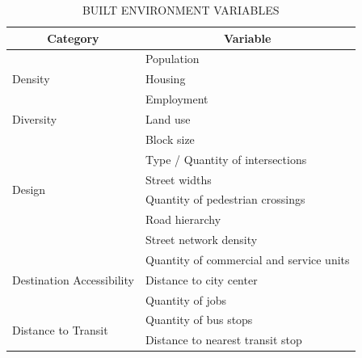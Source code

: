 \begin{table}[!hbtp]
    \footnotesize
    \captionsetup{justification=raggedright,
        singlelinecheck=false,
        font=footnotesize}
    \caption{BUILT ENVIRONMENT VARIABLES}
    \centering
    \begin{tabular}{ll}
        \hline
        \multicolumn{1}{c}{\textbf{Category}}                          & \multicolumn{1}{c}{\textbf{Variable}}                        \\ \hline
        \multirow{3}{*}{Density}                   & Population                               \\
                                                   & Housing                                  \\
                                                   & Employment                               \\ \hline
        \multirow{1}{*}{Diversity}                 & Land use                                 \\
                                                   \hline
        \multirow{6}{*}{Design}                    & Block size                               \\
                                                   & Type / Quantity of intersections                \\
                                                   & Street widths                            \\
                                                   & Quantity of pedestrian crossings         \\
                                                   & Road hierarchy \\
                                                   & Street network density \\
                                                    \hline
        \multirow{3}{*}{Destination Accessibility} & Quantity of commercial and service units \\
                                                   & Distance to city center                  \\
                                                   & Quantity of jobs                         \\ \hline
        \multirow{2}{*}{Distance to Transit}       & Quantity of bus stops                    \\
                                                   & Distance to nearest transit stop         \\

\end{tabular}
\end{table}
